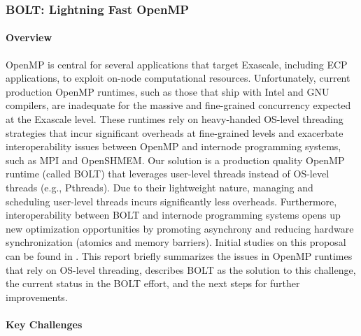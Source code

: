 \newpage
\subsubsection{ BOLT: Lightning Fast OpenMP}\label{subsubsect:bolt}

\paragraph{Overview}

OpenMP is central for several applications that target Exascale,
including ECP applications, to exploit on-node computational
resources.  Unfortunately, current production OpenMP runtimes, such as
those that ship with Intel and GNU compilers, are inadequate for the
massive and fine-grained concurrency expected at the Exascale level.
These runtimes rely on heavy-handed OS-level threading strategies that
incur significant overheads at fine-grained levels and exacerbate
interoperability issues between OpenMP and internode programming
systems, such as MPI and OpenSHMEM.  Our solution is a production
quality OpenMP runtime (called BOLT) that leverages user-level threads
instead of OS-level threads (e.g., Pthreads).  Due to their
lightweight nature, managing and scheduling user-level threads incurs
significantly less overheads.  Furthermore, interoperability between
BOLT and internode programming systems opens up new optimization
opportunities by promoting asynchrony and reducing hardware
synchronization (atomics and memory barriers).  Initial studies on
this proposal can be found in \cite{amer2018, ccgrid, ppopp}. This
report briefly summarizes the issues in OpenMP runtimes that rely on
OS-level threading, describes BOLT as the solution to this challenge,
the current status in the BOLT effort, and the next steps for further
improvements.

\paragraph{Key Challenges}

